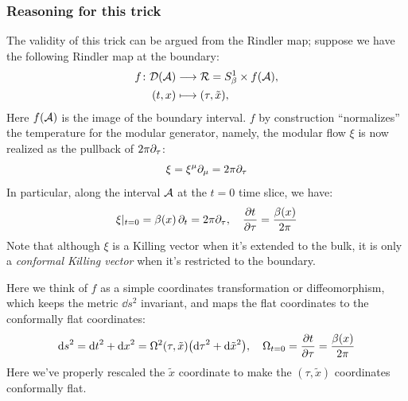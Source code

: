 \documentclass[11pt,a4paper]{article}
\begin{document}
\subsubsection*{Reasoning for this trick}
	The validity of this trick can be argued from the Rindler map; suppose we have the following Rindler map at the boundary:
	\begin{equation}
	\begin{aligned}
		f\colon
		\mathcal{D}(\mathcal{A})
		&\longrightarrow \mathcal{R} = S^1_\beta \times f(\mathcal{A}), \\
		(t,x)
		&\longmapsto (\tau,\tilde{x}),
	\end{aligned}
	\end{equation}
	Here $f(\mathcal{A})$ is the image of the boundary interval. $f$ by construction ``normalizes'' the temperature for the modular generator, namely, the modular flow $\xi$ is now realized as the pullback of $2\pi\partial_{\tau}$:
	\begin{equation}
		\xi = \xi^\mu \partial_{\mu}
		= 2\pi\partial_{\tau}
	\end{equation}
	In particular, along the interval $\mathcal{A}$ at the $t = 0$ time slice, we have:
	\begin{equation}
		\xi|_{t = 0}
		= \beta(x)\,\partial_{t}
		= 2\pi\partial_{\tau},
	\quad
		\pdv{t}{\tau}
		= \frac{\beta(x)}{2\pi}
	\end{equation}
	Note that although $\xi$ is a Killing vector when it's extended to the bulk, it is only a \textit{conformal Killing vector} when it's restricted to the boundary. 
	
	Here we think of $f$ as a simple coordinates transformation or diffeomorphism, which keeps the metric $\dd{s}^2$ invariant, and maps the flat coordinates to the conformally flat coordinates:
	\begin{equation}
		\dd{s}^2
		= \dd{t}^2 + \dd{x}^2
		= \Omega^2(\tau,\tilde{x}) \pqty{
				\dd{\tau}^2 + \dd{\tilde{x}}^2
			},
	\quad
		\Omega_{t = 0} = \pdv{t}{\tau}
		= \frac{\beta(x)}{2\pi}
	\end{equation}
	Here we've properly rescaled the $\tilde{x}$ coordinate to make the $(\tau,\tilde{x})$ coordinates conformally flat. 
	
\end{document}
